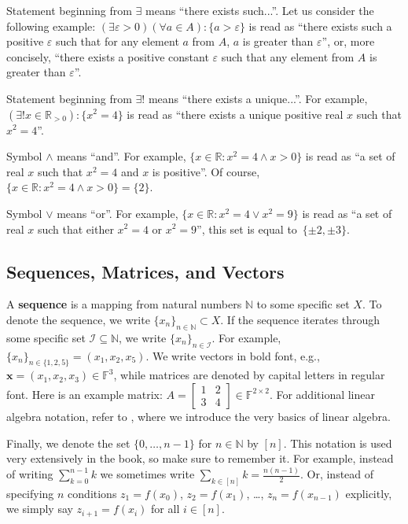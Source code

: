 \documentclass[../lecture-notes-148x210.tex]{subfiles}
\begin{document}
Statement beginning from $\exists$ means ``there exists such...''. Let us consider the following example: 
$(\exists \varepsilon > 0) (\forall a \in A): \{a > \varepsilon\}$ is read as ``there exists such a positive $\varepsilon$ such 
that for any element $a$ from $A$, $a$ is greater than $\varepsilon$'', or, more concisely, ``there exists a positive constant 
$\varepsilon$ such that any element from $A$ is greater than $\varepsilon$''.

Statement beginning from $\exists !$ means ``there exists a unique...''. For example, $(\exists! x \in \mathbb{R}_{>0}): \{x^2 = 4\}$ 
is read as ``there exists a unique positive real $x$ such that $x^2 = 4$''.

Symbol $\wedge$ means ``and''. For example, $\{x \in \mathbb{R}: x^2 = 4 \wedge x > 0\}$ is read as ``a set of real $x$ such that 
$x^2=4$ and $x$ is positive''. Of course, $\{x \in \mathbb{R}: x^2 = 4 \wedge x > 0\} = \{2\}$.

Symbol $\vee$ means ``or''. For example, $\{x \in \mathbb{R}: x^2 = 4 \vee x^2 = 9\}$ is read as ``a set of real $x$ such that 
either $x^2=4$ or $x^2=9$'', this set is equal to~$\{\pm 2, \pm 3\}$.

\subsection*{Sequences, Matrices, and Vectors}

A \textbf{sequence} is a mapping from natural numbers $\mathbb{N}$ to some
specific set $X$. To denote the sequence, we write $\{x_n\}_{n \in \mathbb{N}}
\subset X$. If the sequence iterates through some specific set $\mathcal{I}
\subseteq \mathbb{N}$, we write $\{x_n\}_{n \in \mathcal{I}}$. For example,
$\{x_n\}_{n \in \{1,2,5\}} = (x_1, x_2, x_5)$. We write vectors in bold font,
e.g., $\mathbf{x} = (x_1, x_2, x_3) \in \mathbb{F}^3$, while matrices are
denoted by capital letters in regular font. Here is an example matrix: $A =
\begin{bmatrix} 1 & 2 \\ 3 & 4 \end{bmatrix} \in \mathbb{F}^{2 \times 2}$. For
additional linear algebra notation, refer to ,
where we introduce the very basics of linear algebra.

Finally, we denote the set $\{0,\dots,n-1\}$ for $n \in \mathbb{N}$ by $[n]$.
This notation is used very extensively in the book, so make sure to remember it.
For example, instead of writing $\sum_{k=0}^{n-1}k$ we sometimes write $\sum_{k
\in [n]}k = \frac{n(n-1)}{2}$. Or, instead of specifying $n$ conditions
$z_1=f(x_0)$, $z_2=f(x_1)$, \dots, $z_n=f(x_{n-1})$ explicitly, we simply say
$z_{i+1} = f(x_i)$ for all $i \in [n]$.
\end{document}
